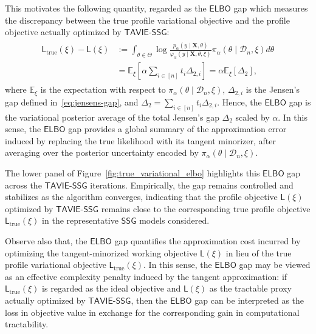 \documentclass[12pt]{article}
\numberwithin{equation}{section}
\newcommand{\ssg}{\mathsf{SSG}}
\newcommand{\tssg}{\mathsf{TAVIE}\text{-}\mathsf{SSG}}
\begin{document}
This motivates the following quantity, regarded as the $\mathsf{ELBO}$ gap which measures the discrepancy between the true profile variational objective and the profile objective actually optimized by $\tssg$:
\begin{align}
\label{eq:ELBO-gap}
\begin{split}
\mathsf{L}_{\mathrm{true}}(\xi) - \mathsf{L}(\xi) &:= \int_{\theta\in \Theta}\log \frac{p_{\alpha}(y\mid \mathbf X, \theta)}{\varphi_\alpha(y\mid \mathbf{X}, \theta, \xi)}\pi_{\alpha}(\theta\mid \mathcal D_n, \xi)d\theta \\
&= \mathbb{E}_{\xi}\left[\alpha \sum_{i\in [n]}t_i\Delta_{2, i}\right] = \alpha \mathbb{E}_{\xi}[\Delta_2],
\end{split}
\end{align}
where $\mathbb{E}_{\xi}$ is the expectation with respect to $\pi_{\alpha}(\theta\mid \mathcal D_n, \xi)$, $\Delta_{2, i}$ is the Jensen's gap defined in~\eqref{eq:jensens-gap}, and $\Delta_2 = \sum_{i\in [n]}t_i \Delta_{2, i}$. Hence, the $\mathsf{ELBO}$ gap is the variational posterior average of the total Jensen's gap $\Delta_2$ scaled by $\alpha$. In this sense, the $\mathsf{ELBO}$ gap provides a global summary of the approximation error induced by replacing the true likelihood with its tangent minorizer, after averaging over the posterior uncertainty encoded by $\pi_{\alpha}(\theta\mid \mathcal{D}_n, \xi)$.

The lower panel of Figure~\ref{fig:true_variational_elbo} highlights this $\mathsf{ELBO}$ gap across the $\tssg$ iterations. Empirically, the gap remains controlled and stabilizes as the algorithm converges, indicating that the profile objective $\mathsf{L}(\xi)$ optimized by $\tssg$ remains close to the corresponding true profile objective $\mathsf{L}_{\mathrm{true}}(\xi)$ in the representative $\ssg$ models considered.

Observe also that, the $\mathsf{ELBO}$ gap quantifies the approximation cost incurred by optimizing the tangent-minorized working objective $\mathsf{L}(\xi)$ in lieu of the true profile variational objective $\mathsf{L}_{\mathrm{true}}(\xi)$.
In this sense, the $\mathsf{ELBO}$ gap may be viewed as an effective complexity penalty induced by the tangent approximation: if $\mathsf{L}_{\mathrm{true}}(\xi)$ is regarded as the ideal objective and $\mathsf{L}(\xi)$ as the tractable proxy actually optimized by $\tssg$, then the $\mathsf{ELBO}$ gap can be interpreted as the loss in objective value in exchange for the corresponding gain in computational tractability.
\end{document}
